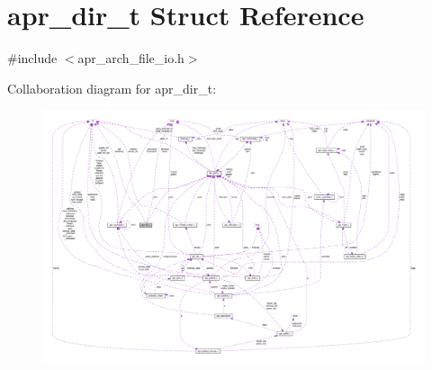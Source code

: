\hypertarget{structapr__dir__t}{}\section{apr\+\_\+dir\+\_\+t Struct Reference}
\label{structapr__dir__t}


{\ttfamily \#include $<$apr\+\_\+arch\+\_\+file\+\_\+io.\+h$>$}



Collaboration diagram for apr\+\_\+dir\+\_\+t\+:
\nopagebreak
\begin{figure}[H]
\begin{center}
\leavevmode
\includegraphics[width=350pt]{structapr__dir__t__coll__graph}
\end{center}
\end{figure}
